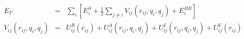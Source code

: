 \documentclass[12pt]{article}
\begin{document}
\begin{eqnarray*}
E_T & = & \sum_i [ E_i^S + \frac{1}{2} \sum_{j \neq i} V_{ij}
  (r_{ij},q_i,q_j) + E_i^{BB} ] \\
V_{ij}(r_{ij},q_i,q_j) & = & U_{ij}^R(r_{ij}) + U_{ij}^A(r_{ij},
  q_i,q_j) + U_{ij}^I(r_{ij},q_i,q_j) + U_{ij}^V(r_{ij}) \\
\end{eqnarray*}                           
\end{document}
